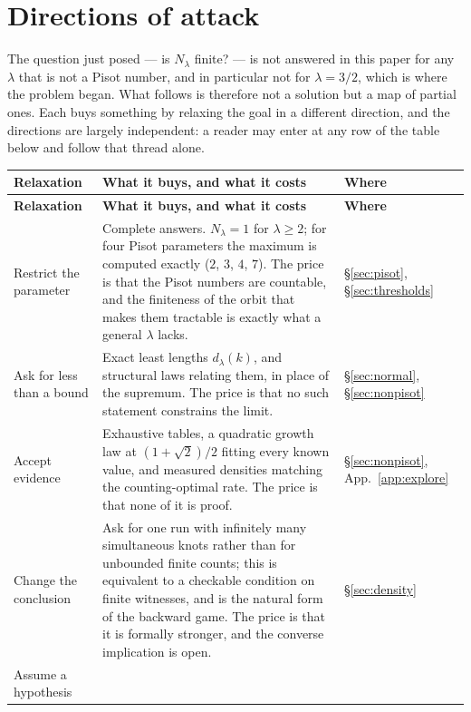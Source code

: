 \documentclass[11pt,reqno]{amsart}
\theoremstyle{plain}
\theoremstyle{definition}
\theoremstyle{remark}
\begin{document}
\section{Directions of attack}\label{sec:directions}

The question just posed --- is $N_\lambda$ finite? --- is not answered in this
paper for any $\lambda$ that is not a Pisot number, and in particular not for
$\lambda=3/2$, which is where the problem began. What follows is therefore not
a solution but a map of partial ones. Each buys something by relaxing the goal
in a different direction, and the directions are largely independent: a reader
may enter at any row of the table below and follow that thread alone.

\medskip
\begin{longtable}{@{}p{}p{}p{}@{}}
\toprule
\textbf{Relaxation} & \textbf{What it buys, and what it costs} &
\textbf{Where}\\
\midrule
\endfirsthead
\toprule
\textbf{Relaxation} & \textbf{What it buys, and what it costs} &
\textbf{Where}\\
\midrule
\endhead
\bottomrule
\endfoot
\bottomrule
\endlastfoot
Restrict the parameter &
Complete answers. $N_\lambda=1$ for $\lambda\geq2$; for four Pisot parameters
the maximum is computed exactly ($2$, $3$, $4$, $7$). The price is that the
Pisot numbers are countable, and the finiteness of the orbit that makes them
tractable is exactly what a general $\lambda$ lacks. &
\S\ref{sec:pisot}, \S\ref{sec:thresholds}\\[2pt]
Ask for less than a bound &
Exact least lengths $d_\lambda(k)$, and structural laws relating them, in
place of the supremum. The price is that no such statement constrains the
limit. &
\S\ref{sec:normal}, \S\ref{sec:nonpisot}\\[2pt]
Accept evidence &
Exhaustive tables, a quadratic growth law at $(1+\sqrt2)/2$ fitting every
known value, and measured densities matching the counting-optimal rate. The
price is that none of it is proof. &
\S\ref{sec:nonpisot}, App.~\ref{app:explore}\\[2pt]
Change the conclusion &
Ask for one run with infinitely many simultaneous knots rather than for
unbounded finite counts; this is equivalent to a checkable condition on
finite witnesses, and is the natural form of the backward game. The price is
that it is formally stronger, and the converse implication is open. &
\S\ref{sec:density}\\[2pt]
Assume a hypothesis &

\end{longtable}
\end{document}

